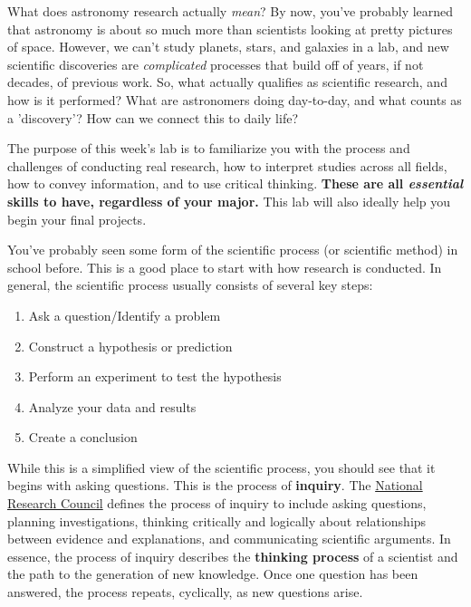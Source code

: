 \documentclass[11pt]{article}%
\begin{document}
What does astronomy research actually \textit{mean}? By now, you've probably learned that astronomy is about so much more than scientists looking at pretty pictures of space. However, we can't study planets, stars, and galaxies in a lab, and new scientific discoveries are \textit{complicated} processes that build off of years, if not decades, of previous work. So, what actually qualifies as scientific research, and how is it performed? What are astronomers doing day-to-day, and what counts as a 'discovery'? How can we connect this to daily life?

The purpose of this week's lab is to familiarize you with the process and challenges of conducting real research, how to interpret studies across all fields, how to convey information, and to use critical thinking. \textbf{These are all \textit{essential} skills to have, regardless of your major.} This lab will also ideally help you begin your final projects.

You've probably seen some form of the scientific process (or scientific method) in school before. This is a good place to start with how research is conducted. In general, the scientific process usually consists of several key steps:

\begin{enumerate}
    \item Ask a question/Identify a problem
    \item Construct a hypothesis or prediction
    \item Perform an experiment to test the hypothesis
    \item Analyze your data and results
    \item Create a conclusion
\end{enumerate}

 While this is a simplified view of the scientific process, you should see that it begins with asking questions. This is the process of \textbf{inquiry}. The \href{https://eric.ed.gov/?id=ED391690}{National Research Council} defines the process of inquiry to include asking questions, planning investigations, thinking critically and logically about relationships between evidence and explanations, and communicating scientific arguments. In essence, the process of inquiry describes the \textbf{thinking process} of a scientist and the path to the generation of new knowledge. Once one question has been answered, the process repeats, cyclically, as new questions arise. 
\end{document}
